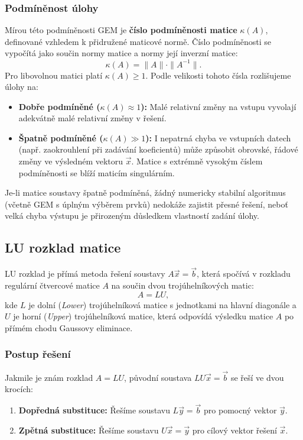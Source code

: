 \subsubsection{Podmíněnost úlohy}
Mírou této podmíněnosti GEM je \textbf{číslo podmíněnosti matice} $\kappa(A)$, definované vzhledem k přidružené maticové normě. Číslo podmíněnosti se vypočítá jako součin normy matice a normy její inverzní matice:
\[ 
\kappa(A) = \|A\| \cdot \|A^{-1}\|.
\]
Pro libovolnou matici platí $\kappa(A) \ge 1$. Podle velikosti tohoto čísla rozlišujeme úlohy na:
\begin{itemize}
    \item \textbf{Dobře podmíněné ($\kappa(A) \approx 1$):} Malé relativní změny na vstupu vyvolají adekvátně malé relativní změny v řešení.
    \item \textbf{Špatně podmíněné ($\kappa(A) \gg 1$):} I nepatrná chyba ve vstupních datech (např. zaokrouhlení při zadávání koeficientů) může způsobit obrovské, řádové změny ve výsledném vektoru $\vec{x}$. Matice s extrémně vysokým číslem podmíněnosti se blíží maticím singulárním.
\end{itemize}
Je-li matice soustavy špatně podmíněná, žádný numericky stabilní algoritmus (včetně GEM s úplným výběrem prvků) nedokáže zajistit přesné řešení, neboť velká chyba výstupu je přirozeným důsledkem vlastností zadání úlohy.

\subsection{LU rozklad matice}

LU rozklad je přímá metoda řešení soustavy $A\vec{x} = \vec{b}$, která spočívá v rozkladu regulární čtvercové matice $A$ na součin dvou trojúhelníkových matic:
\[ 
A = LU,
\]
kde $L$ je dolní (\textit{Lower}) trojúhelníková matice s jednotkami na hlavní diagonále a $U$ je horní (\textit{Upper}) trojúhelníková matice, která odpovídá výsledku matice $A$ po přímém chodu Gaussovy eliminace.

\subsubsection{Postup řešení}
Jakmile je znám rozklad $A = LU$, původní soustava $LU\vec{x} = \vec{b}$ se řeší ve dvou krocích:
\begin{enumerate}
    \item \textbf{Dopředná substituce:} Řešíme soustavu $L\vec{y} = \vec{b}$ pro pomocný vektor $\vec{y}$.
    \item \textbf{Zpětná substituce:} Řešíme soustavu $U\vec{x} = \vec{y}$ pro cílový vektor řešení $\vec{x}$.
\end{enumerate}

